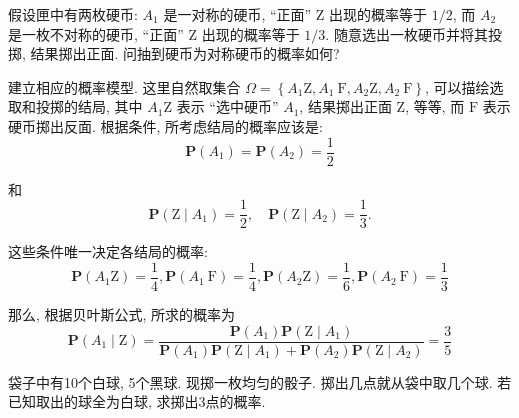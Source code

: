\begin{example}
    假设匣中有两枚硬币: $A_1$ 是一对称的硬币, “正面” $\mathrm{Z}$ 出现的概率等于 $1 / 2$, 而 $A_2$ 是一枚不对称的硬币, “正面” $\mathrm{Z}$ 出现的概率等于 $1 / 3$. 随意选出一枚硬币并将其投掷, 结果掷出正面. 问抽到硬币为对称硬币的概率如何?
\end{example}

\begin{solution}
    建立相应的概率模型. 这里自然取集合 $\Omega=\left\{A_1 \mathrm{Z}, A_1 \mathrm{~F}, A_2 \mathrm{Z}, A_2 \mathrm{~F}\right\}$, 可以描绘选取和投掷的结局, 其中 $A_1 \mathrm{Z}$ 表示 “选中硬币” $A_1$, 结果掷出正面 $\mathrm{Z}$, 等等, 而 $\mathrm{F}$ 表示硬币掷出反面. 根据条件, 所考虑结局的概率应该是:
$$
\mathbf{P}\left(A_1\right)=\mathbf{P}\left(A_2\right)=\frac{1}{2}
$$

和
$$
\mathbf{P}\left(\mathrm{Z} \mid A_1\right)=\frac{1}{2}, \quad \mathbf{P}\left(\mathrm{Z} \mid A_2\right)=\frac{1}{3} .
$$

这些条件唯一决定各结局的概率:
$$
\mathbf{P}\left(A_1 \mathrm{Z}\right)=\frac{1}{4}, \mathbf{P}\left(A_1 \mathrm{~F}\right)=\frac{1}{4}, \mathbf{P}\left(A_2 \mathrm{Z}\right)=\frac{1}{6}, \mathbf{P}\left(A_2 \mathrm{~F}\right)=\frac{1}{3}
$$

那么, 根据贝叶斯公式, 所求的概率为
$$
\mathbf{P}\left(A_1 \mid \mathrm{Z}\right)=\frac{\mathbf{P}\left(A_1\right) \mathbf{P}\left(\mathrm{Z} \mid A_1\right)}{\mathbf{P}\left(A_1\right) \mathbf{P}\left(\mathrm{Z} \mid A_1\right)+\mathbf{P}\left(A_2\right) \mathbf{P}\left(\mathrm{Z} \mid A_2\right)}=\frac{3}{5}
$$
\end{solution}

\begin{example}
    袋子中有10个白球, 5个黑球. 现掷一枚均匀的骰子. 掷出几点就从袋中取几个球. 若已知取出的球全为白球, 求掷出3点的概率. 
\end{example}
